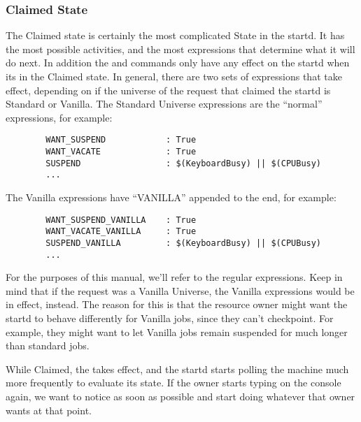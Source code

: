 \subsubsection{Claimed State}
\label{sec:Claimed-State}

The Claimed state is certainly the most complicated State in the
startd.  It has the most possible activities, and the most expressions
that determine what it will do next.  In addition the
 and  commands only have any effect
on the startd when its in the Claimed state.  In general, there are
two sets of expressions that take effect, depending on if the universe
of the request that claimed the startd is Standard or Vanilla.  The
Standard Universe expressions are the ``normal'' expressions, for
example:

\begin{verbatim}
        WANT_SUSPEND            : True
        WANT_VACATE             : True
        SUSPEND                 : $(KeyboardBusy) || $(CPUBusy)
        ...
\end{verbatim}

The Vanilla expressions have ``VANILLA'' appended to the end, for
example:

\begin{verbatim}
        WANT_SUSPEND_VANILLA    : True
        WANT_VACATE_VANILLA     : True
        SUSPEND_VANILLA         : $(KeyboardBusy) || $(CPUBusy)
        ...
\end{verbatim}

For the purposes of this manual, we'll refer to the regular
expressions.  Keep in mind that if the request was a Vanilla Universe,
the Vanilla expressions would be in effect, instead.  The reason for
this is that the resource owner might want the startd to behave
differently for Vanilla jobs, since they can't checkpoint.  For
example, they might want to let Vanilla jobs remain suspended for much
longer than standard jobs.

While Claimed, the  takes effect, and the
startd starts polling the machine much more frequently to evaluate its
state.  If the owner starts typing on the console again, we want to
notice as soon as possible and start doing whatever that owner wants
at that point.  

